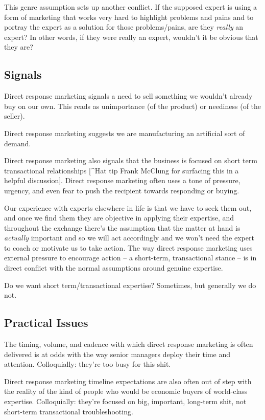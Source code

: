 \documentclass[13pt,]{tufte-handout}
\begin{document}
This genre assumption sets up another conflict. If the supposed expert
is using a form of marketing that works very hard to highlight problems
and pains and to portray the expert as a solution for those
problems/pains, are they \emph{really} an expert? In other words, if
they were really an expert, wouldn't it be obvious that they are?

\hypertarget{signals}{%
\subsection{Signals}\label{signals}}

Direct response marketing signals a need to sell something we wouldn't
already buy on our own. This reads as unimportance (of the product) or
neediness (of the seller).

Direct response marketing suggests we are manufacturing an artificial
sort of demand.

Direct response marketing also signals that the business is focused on
short term transactional relationships {[}\^{}Hat tip Frank McClung for
surfacing this in a helpful discussion{]}. Direct response marketing
often uses a tone of pressure, urgency, and even fear to push the
recipient towards responding or buying.

Our experience with experts elsewhere in life is that we have to seek
them out, and once we find them they are objective in applying their
expertise, and throughout the exchange there's the assumption that the
matter at hand is \emph{actually} important and so we will act
accordingly and we won't need the expert to coach or motivate us to take
action. The way direct response marketing uses external pressure to
encourage action -- a short-term, transactional stance -- is in direct
conflict with the normal assumptions around genuine expertise.

Do we want short term/transactional expertise? Sometimes, but generally
we do not.

\hypertarget{practical-issues}{%
\subsection{Practical Issues}\label{practical-issues}}

The timing, volume, and cadence with which direct response marketing is
often delivered is at odds with the way senior managers deploy their
time and attention. Colloquially: they're too busy for this shit.

Direct response marketing timeline expectations are also often out of
step with the reality of the kind of people who would be economic buyers
of world-class expertise. Colloquially: they're focused on big,
important, long-term shit, not short-term transactional troubleshooting.
\end{document}
